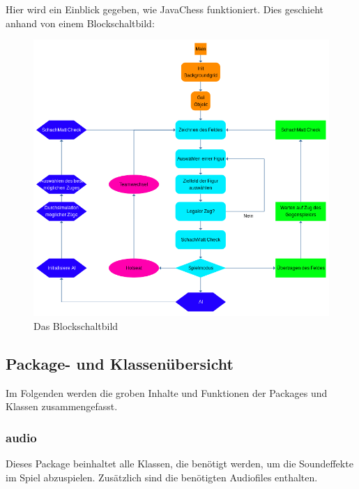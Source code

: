 \documentclass[12pt,a4paper]{article}
\begin{document}
Hier wird ein Einblick gegeben, wie JavaChess funktioniert. Dies geschieht anhand von einem Blockschaltbild: \\
\vspace{1cm}


\begin{figure}[H]
  \centering
   	\includegraphics[width=14cm]{graphics/block.png}
  \caption{Das Blockschaltbild}
  \label{fig:block}
\end{figure}

\newpage
\subsection{Package- und Klassenübersicht}
\label{SUBSEC:PACKAGE}

Im Folgenden werden die groben Inhalte und Funktionen der Packages und Klassen zusammengefasst.\

\subsubsection{audio}

Dieses Package beinhaltet alle Klassen, die benötigt werden, um die Soundeffekte im Spiel abzuspielen. Zusätzlich sind die benötigten Audiofiles enthalten.\
\end{document}

